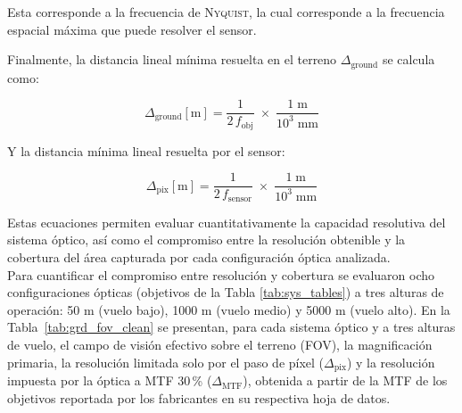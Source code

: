 \noindent Esta corresponde a la frecuencia de \textsc{Nyquist}, la cual corresponde a la frecuencia espacial máxima que puede resolver el sensor.

\noindent Finalmente, la distancia lineal mínima resuelta en el terreno \(\Delta_{\text{ground}}\) se calcula como:

\begin{equation}
    \Delta_{\text{ground}}[\text{m}] =
    \frac{1}{2\,f_{\text{obj}}}\;\times\;
    \frac{1\;\text{m}}{10^{3}\;\text{mm}}
    \label{eq:delta_ground}
\end{equation}

\noindent Y la distancia mínima lineal resuelta por el sensor:

\begin{equation}
  \Delta_{\text{pix}}[\text{m}] =
  \frac{1}{2\,f_{\text{sensor}}}\;\times\;
  \frac{1\;\text{m}}{10^{3}\; \text{mm}}
  \label{eq:delta_ground_sensor}
\end{equation}

\noindent Estas ecuaciones permiten evaluar cuantitativamente la capacidad resolutiva del sistema óptico, así como el compromiso entre la resolución obtenible y la cobertura del área capturada por cada configuración óptica analizada.\\

Para cuantificar el compromiso entre resolución y cobertura se evaluaron ocho
configuraciones ópticas (objetivos de la Tabla \ref{tab:sys_tables}) a tres alturas de
operación: 50 m (vuelo bajo), 1000 m (vuelo medio) y 5000 m (vuelo alto). En la Tabla~\ref{tab:grd_fov_clean} se presentan, para cada sistema óptico y a tres alturas de vuelo, el campo de visión efectivo sobre el terreno (FOV), la magnificación primaria, la resolución limitada solo por el paso de píxel (\(\Delta_{\mathrm{pix}}\)) y la resolución impuesta por la óptica a MTF 30\,\% (\(\Delta_{\mathrm{MTF}}\)), obtenida a partir de la MTF de los objetivos reportada por los fabricantes en su respectiva hoja de datos.\\



